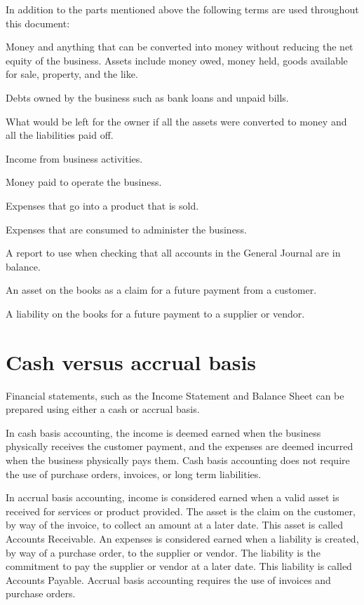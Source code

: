 In addition to the parts mentioned above the following terms are used throughout this
document:
\begin{description}[style=nextline]
	\item [Assets] Money and anything that can be converted into money without reducing
	the net equity of the business. Assets include money owed, money held, goods
	available for sale, property, and the like.
	\item [Liabilities] Debts owned by the business such as bank loans and unpaid bills.
	\item [Equity] What would be left for the owner if all the assets were converted to
	money and all the liabilities paid off.
	\item [Revenue] Income from business activities.
	\item [Expense] Money paid to operate the business.
	\item [Cost of Goods] Expenses that go into a product that is sold.
	\item [Operating Expenses] Expenses that are consumed to administer the business.
	\item [Trial Balance] A report to use when checking that all accounts in the
	General Journal are in balance.
	\item [Accounts Receivable] An asset on the books as a claim for a future payment
	from a customer.
	\item [Accounts Payable] A liability on the books for a future payment to a supplier
	or vendor.
\end{description}

\section{Cash versus accrual basis}
\label{sec-accounting-cash-vs-accrual}

Financial statements, such as the Income Statement and Balance Sheet can be prepared using
either a cash or accrual basis.

In \gls{cash basis} accounting, the income is deemed earned when the business physically
receives the customer payment, and the expenses are deemed incurred when the business
physically pays them. Cash basis accounting does not require the use of purchase orders,
invoices, or long term liabilities.

In \gls{accrual basis} accounting, income is considered earned when a valid asset is
received for services or product provided. The asset is the claim on the customer,
by way of the invoice, to collect an amount at a later date. This asset is called
Accounts Receivable. An expenses is considered earned when a liability is created,
by way of a purchase order, to the supplier or vendor. The liability is the commitment
to pay the supplier or vendor at a later date. This liability is called Accounts Payable.
Accrual basis accounting requires the use of invoices and purchase orders.


